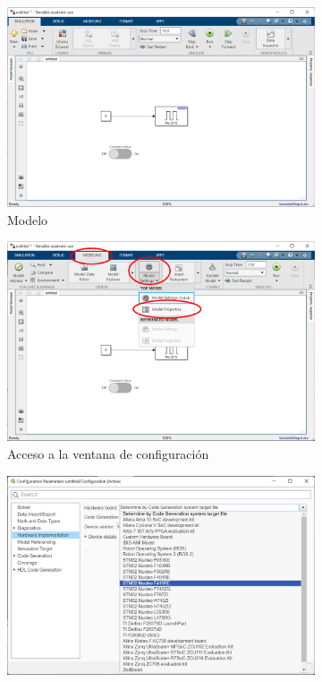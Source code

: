 \documentclass[10pt,a4paper]{report}
\begin{document}
\begin{figure}
\begin{subfigure}{0.5\textwidth}
\centering
\includegraphics[width = \linewidth]{ejemplo1.png}
\caption{Modelo}\label{f17a}
\end{subfigure}
\begin{subfigure}{0.5\textwidth}
\centering
\includegraphics[width = \linewidth]{settings1.png}
\caption{Acceso a la ventana de configuración}\label{f17b}
\end{subfigure}
\begin{subfigure}{0.5\textwidth}
\centering
\includegraphics[width = \linewidth]{settings2.png}

\end{subfigure}
\end{figure}
\end{document}
